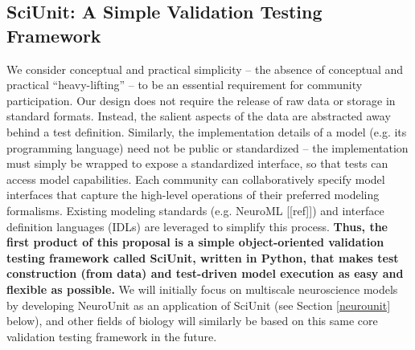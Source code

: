 \documentclass[11pt,letterpaper]{article}
\begin{document}
\subsection{SciUnit: A Simple Validation Testing Framework}
We consider conceptual and practical simplicity -- the absence of conceptual and practical ``heavy-lifting'' -- to be an essential requirement for community participation. Our design does not require the release of raw data or storage in standard formats. Instead, the salient aspects of the data are abstracted away behind a test definition. Similarly, the implementation details of a model (e.g. its programming language) need not be public or standardized -- the implementation must simply be wrapped to expose a standardized interface, so that tests can access model capabilities. Each community can collaboratively specify model interfaces that capture the high-level operations of their preferred modeling formalisms. Existing modeling standards (e.g. NeuroML [[ref]]) and interface definition languages (IDLs) \cite{Bachmann2008} are leveraged to simplify this process. \textbf{Thus, the first product of this proposal is a simple object-oriented validation testing framework called \textbf{SciUnit}, written in Python, that makes test construction (from data) and test-driven model execution as easy and flexible as possible.} We will initially focus on multiscale neuroscience models by developing NeuroUnit as an application of SciUnit (see Section \ref{neurounit} below), and other fields of biology will similarly be based on this same core validation testing framework in the future. 
\end{document}
